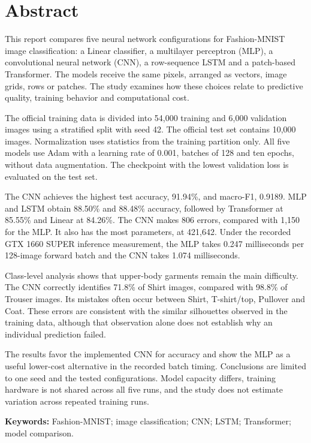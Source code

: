 \section*{Abstract}

This report compares five neural network configurations for Fashion-MNIST image
classification: a Linear classifier, a multilayer perceptron (MLP), a convolutional
neural network (CNN), a row-sequence LSTM and a patch-based Transformer.
The models receive the same pixels, arranged as vectors, image grids, rows or
patches. The study examines how these choices relate to predictive quality,
training behavior and computational cost.

The official training data is divided into 54,000 training and 6,000 validation
images using a stratified split with seed 42. The official test set contains
10,000 images. Normalization uses statistics from the training partition only.
All five models use Adam with a learning rate of 0.001, batches of 128 and ten
epochs, without data augmentation. The checkpoint with the lowest validation
loss is evaluated on the test set.

The CNN achieves the highest test accuracy, 91.94\%, and macro-F1, 0.9189.
MLP and LSTM obtain 88.50\% and 88.48\% accuracy, followed by Transformer at
85.55\% and Linear at 84.26\%. The CNN makes 806 errors, compared with
1,150 for the MLP. It also has the most parameters, at 421,642. Under the recorded
GTX 1660 SUPER inference measurement, the MLP takes 0.247 milliseconds per
128-image forward batch and the CNN takes 1.074 milliseconds.

Class-level analysis shows that upper-body garments remain the main difficulty.
The CNN correctly identifies 71.8\% of Shirt images, compared with 98.8\% of
Trouser images. Its mistakes often occur between Shirt, T-shirt/top, Pullover
and Coat. These errors are consistent with the similar silhouettes observed
in the training data, although that observation alone does not establish why
an individual prediction failed.

The results favor the implemented CNN for accuracy and show the MLP as a useful
lower-cost alternative in the recorded batch timing. Conclusions are limited
to one seed and the tested configurations. Model capacity differs, training
hardware is not shared across all five runs, and the study does not estimate
variation across repeated training runs.

\vspace{8pt}
\textbf{Keywords:} Fashion-MNIST; image classification; CNN; LSTM; Transformer;
model comparison.








